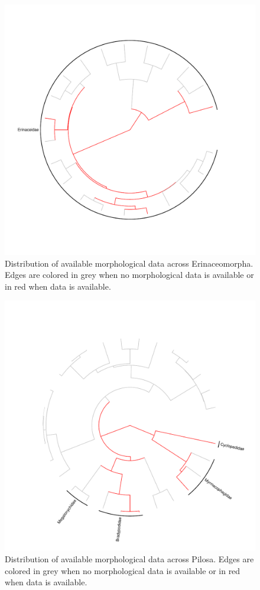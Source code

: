 \begin{figure}[!htbp]
\centering
    \includegraphics[width=1\textwidth]{Supplementary/Supp_figure_ERINACEOMORPHA.pdf}
\caption{Distribution of available morphological data across Erinaceomorpha. Edges are colored in grey when no morphological data is available or in red when data is available.}
\label{Supp_Figure_Phylo-Erinaceomorpha}
\end{figure}

\begin{figure}[!htbp]
\centering
    \includegraphics[width=1\textwidth]{Supplementary/Supp_figure_PILOSA.pdf}
\caption{Distribution of available morphological data across Pilosa. Edges are colored in grey when no morphological data is available or in red when data is available.}
\label{Supp_Figure_Phylo-Pilosa}
\end{figure}

